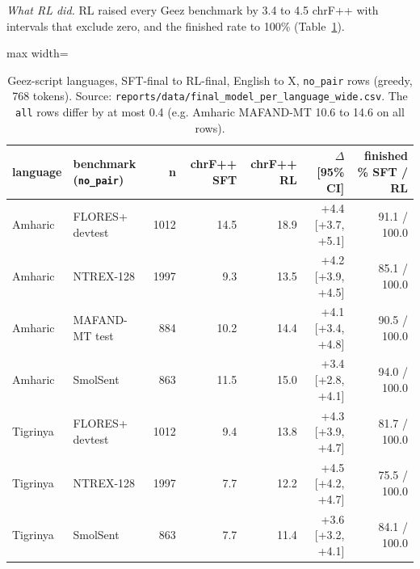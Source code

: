 \emph{What RL did.} RL raised every Ge\textquotesingle ez benchmark by 3.4 to 4.5 chrF++ with intervals that exclude zero, and the finished rate to 100\% (Table~\ref{tab:t_geez}).

\begin{table}[t]
\centering
\footnotesize
\setlength{\tabcolsep}{3pt}
\caption{Ge\textquotesingle ez-script languages, SFT-final to RL-final, English to X, \texttt{no\_pair} rows (greedy, 768 tokens). Source: \texttt{reports/data/final\_model\_per\_language\_wide.csv}. The \texttt{all} rows differ by at most 0.4 (e.g. Amharic MAFAND-MT 10.6 to 14.6 on all rows).}
\label{tab:t_geez}
\begin{adjustbox}{max width=\linewidth}
{\def\LTcaptype{none} %
\begin{tabular}{@{}llrrrrr@{}}
\toprule
language & benchmark (\texttt{no\_pair}) & n & chrF++ SFT & chrF++ RL & \(\Delta\) {[}95\% CI{]} & finished \% SFT / RL \\
\midrule
Amharic & FLORES+ devtest & 1012 & 14.5 & 18.9 & +4.4 {[}+3.7, +5.1{]} & 91.1 / 100.0 \\
Amharic & NTREX-128 & 1997 & 9.3 & 13.5 & +4.2 {[}+3.9, +4.5{]} & 85.1 / 100.0 \\
Amharic & MAFAND-MT test & 884 & 10.2 & 14.4 & +4.1 {[}+3.4, +4.8{]} & 90.5 / 100.0 \\
Amharic & SmolSent & 863 & 11.5 & 15.0 & +3.4 {[}+2.8, +4.1{]} & 94.0 / 100.0 \\
Tigrinya & FLORES+ devtest & 1012 & 9.4 & 13.8 & +4.3 {[}+3.9, +4.7{]} & 81.7 / 100.0 \\
Tigrinya & NTREX-128 & 1997 & 7.7 & 12.2 & +4.5 {[}+4.2, +4.7{]} & 75.5 / 100.0 \\
Tigrinya & SmolSent & 863 & 7.7 & 11.4 & +3.6 {[}+3.2, +4.1{]} & 84.1 / 100.0 \\
\bottomrule
\end{tabular}
}
\end{adjustbox}
\end{table}


